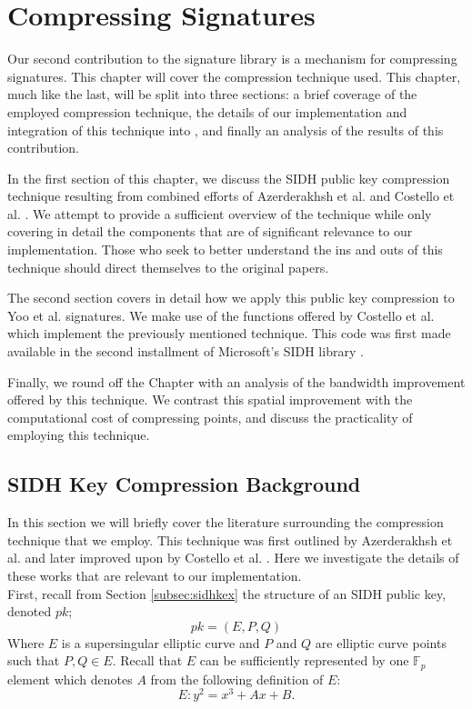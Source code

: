 \chapter{Compressing Signatures}
\label{ch:compress}

Our second contribution to the \sidh signature library is a mechanism for compressing signatures. This chapter will cover the compression technique used. This chapter, much like the last, will be split into three sections: a brief coverage of the employed compression technique, the details of our implementation and integration of this technique into \sidh, and finally an analysis of the results of this contribution.

In the first section of this chapter, we discuss the SIDH public key compression technique resulting from combined efforts of Azerderakhsh et al. \cite{compwr} and Costello et al. \cite{pkcomp}. We attempt to provide a sufficient overview of the technique while only covering in detail the components that are of significant relevance to our implementation. Those who seek to better understand the ins and outs of this technique should direct themselves to the original papers.

The second section covers in detail how we apply this public key compression to Yoo et al. signatures. We make use of the functions offered by Costello et al. which implement the previously mentioned technique. This code was first made available in the second installment of Microsoft's SIDH library \cite{sidhcode}.

Finally, we round off the Chapter with an analysis of the bandwidth improvement offered by this technique. We contrast this spatial improvement with the computational cost of compressing points, and discuss the practicality of employing this technique.

\section{SIDH Key Compression Background}

In this section we will briefly cover the literature surrounding the compression technique that we employ. This technique was first outlined by Azerderakhsh et al. \cite{compwr} and later improved upon by Costello et al. \cite{pkcomp}. Here we investigate the details of these works that are relevant to our implementation.\\

\noindent
First, recall from Section \ref{subsec:sidhkex} the structure of an SIDH public key, denoted $pk$;
$$
pk = (E, P, Q)
$$
Where $E$ is a supersingular elliptic curve and $P$ and $Q$ are elliptic curve points such that $P, Q \in E$. Recall that $E$ can be sufficiently represented by one $\mathbb{F}_{p}$ element which denotes $A$ from the following definition of $E$:
$$
E : y^2 = x^3 + Ax + B.
$$

